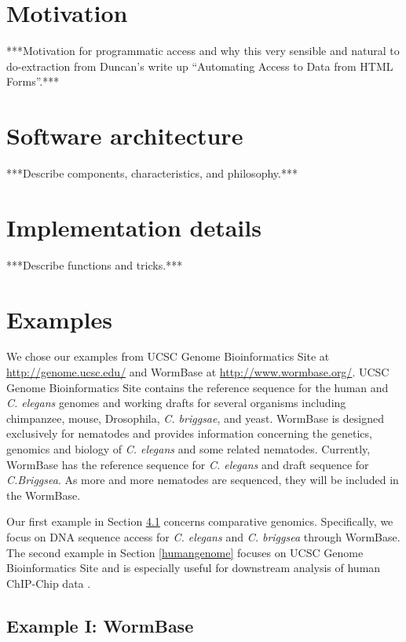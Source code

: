\documentclass[notitlepage,11pt]{article}
\begin{document}
\section{Motivation} \label{M} 

***Motivation for programmatic access and why this very sensible and natural to do-extraction 
from Duncan's write up ``Automating Access to Data from HTML Forms''.***

\section{Software architecture} \label{SA}
***Describe components, characteristics, and philosophy.*** 

\section{Implementation details} \label{ID}
***Describe functions and tricks.***

\section{Examples} \label{EG}

We chose our examples from UCSC Genome Bioinformatics Site at 
\url{http://genome.ucsc.edu/} and WormBase at 
\url{http://www.wormbase.org/}.   UCSC Genome Bioinformatics Site  
contains the reference sequence for 
the human and \textit{C. elegans} genomes and working drafts for several organisms 
including chimpanzee, mouse, Drosophila, \textit{C. briggsae}, and  yeast.
WormBase is designed  exclusively for nematodes and provides information 
concerning the genetics,  genomics and biology of \textit{C. elegans} and 
some related nematodes. Currently, WormBase has the reference sequence for  
\textit{C. elegans} and draft sequence for \textit{C.Briggsea}.  As 
more and more nematodes are sequenced, they will be included in the WormBase.

Our first example in Section \ref{wormbase} concerns comparative genomics. Specifically, we 
focus on DNA sequence access for \textit{C. elegans} and \textit{C. briggsea} through WormBase.
The second example in Section \ref{humangenome} focuses on UCSC Genome Bioinformatics Site and 
is especially useful for downstream analysis of human ChIP-Chip data \citep{Cawley04, Keles04.2}.



\subsection{Example I: WormBase} \label{wormbase}
\end{document}
